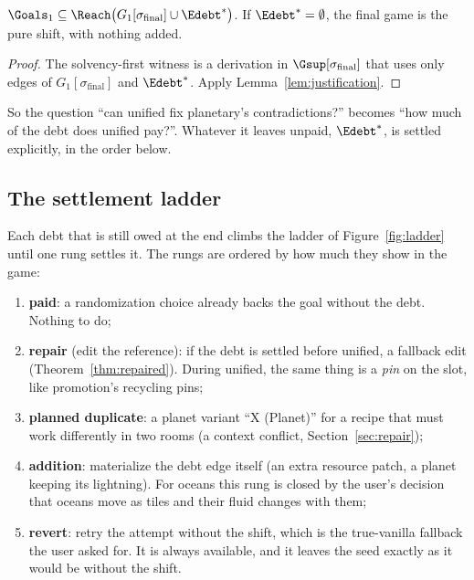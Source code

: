 \begin{theorem}[Settlement]\label{thm:settlement}
$\Goals_1\subseteq\Reach\bigl(G_1[\sigma_{\mathrm{final}}]\cup\Edebt^{*}\bigr)$. If $\Edebt^{*}=\emptyset$, the final game is the pure shift, with nothing added.
\end{theorem}
\begin{proof}
The solvency-first witness is a derivation in $\Gsup[\sigma_{\mathrm{final}}]$ that uses only edges of $G_1[\sigma_{\mathrm{final}}]$ and $\Edebt^{*}$. Apply Lemma~\ref{lem:justification}.
\end{proof}

So the question ``can unified fix planetary's contradictions?'' becomes ``how much of the debt does unified pay?''. Whatever it leaves unpaid, $\Edebt^{*}$, is settled explicitly, in the order below.

\subsection{The settlement ladder}

Each debt that is still owed at the end climbs the ladder of Figure~\ref{fig:ladder} until one rung settles it. The rungs are ordered by how much they show in the game:
\begin{enumerate}[nosep]
\item \textbf{paid}: a randomization choice already backs the goal without the debt. Nothing to do;
\item \textbf{repair} (edit the reference): if the debt is settled before unified, a fallback edit (Theorem~\ref{thm:repaired}). During unified, the same thing is a \emph{pin} on the slot, like promotion's recycling pins;
\item \textbf{planned duplicate}: a planet variant ``X (Planet)'' for a recipe that must work differently in two rooms (a context conflict, Section~\ref{sec:repair});
\item \textbf{addition}: materialize the debt edge itself (an extra resource patch, a planet keeping its lightning). For oceans this rung is closed by the user's decision that oceans move as tiles and their fluid changes with them;
\item \textbf{revert}: retry the attempt without the shift, which is the true-vanilla fallback the user asked for. It is always available, and it leaves the seed exactly as it would be without the shift.
\end{enumerate}

